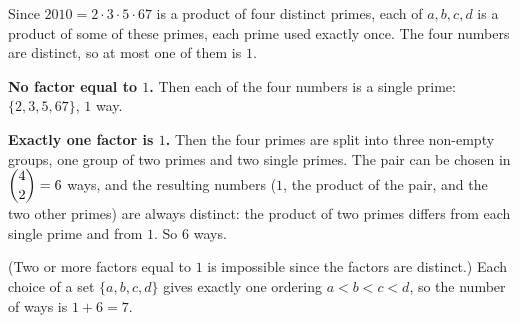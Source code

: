Since $2010=2\cdot3\cdot5\cdot67$ is a product of four distinct primes, each of $a,b,c,d$ is a product of some of these primes, each prime used exactly once. The four numbers are distinct, so at most one of them is $1$.

\textbf{No factor equal to $1$.} Then each of the four numbers is a single prime: $\{2,3,5,67\}$, $1$ way.

\textbf{Exactly one factor is $1$.} Then the four primes are split into three non-empty groups, one group of two primes and two single primes. The pair can be chosen in $\dbinom42=6$ ways, and the resulting numbers ($1$, the product of the pair, and the two other primes) are always distinct: the product of two primes differs from each single prime and from $1$. So $6$ ways.

(Two or more factors equal to $1$ is impossible since the factors are distinct.) Each choice of a set $\{a,b,c,d\}$ gives exactly one ordering $a<b<c<d$, so the number of ways is $1+6=\boxed{7}$.
